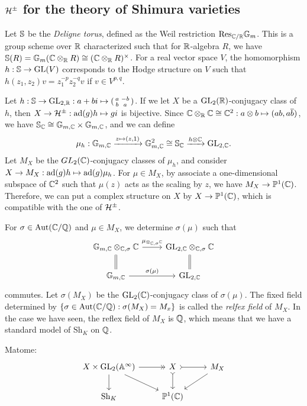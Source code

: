 \documentclass{../../../small}
\newcommand{\Sh}{\mathrm{Sh}}
\begin{document}
\subsection{$\cH^\pm$ for the theory of Shimura varieties}

Let $\S$ be the \emph{Deligne torus}, defined as the Weil restriction $\mathrm{Res}_{\C/\R}\G_m$.
This is a group scheme over $\R$ characterized such that for $\R$-algebra $R$, we have $\S(R)=\G_m(\C\otimes_\R R)\cong(\C\otimes_\R R)^\times$.
For a real vector space $V$, the homomorphism $h:\S\to\GL(V)$ corresponds to the Hodge structure on $V$ such that $h(z_1,z_2)v=z_1^{-p}z_2^{-q}v$ if $v\in V^{p,q}$.

Let $h:\S\to\GL_{2,\R}:a+bi\mapsto(\mat[small]{a&-b\\b&a})$.
If we let $X$ be a $\GL_2(\R)$-conjugacy class of $h$, then $X\to\cH^\pm:\ad(g)h\mapsto gi$ is bijective.
Since $\C\otimes_\R\C\cong\C^2:a\otimes b\mapsto(ab,a\bar b)$, we have $\S_\C\cong\G_{m,\C}\times\G_{m,\C}$, and we can define
\[\mu_h:\G_{m,\C}\xrightarrow{z\mapsto(z,1)}\G_{m,\C}^2\cong\S_\C\xrightarrow{h\otimes\C}\GL_{2,\C}.\]
Let $M_X$ be the $GL_2(\C)$-conjugacy classes of $\mu_h$, and consider $X\to M_X:\ad(g)h\mapsto\ad(g)\mu_h$.
For $\mu\in M_X$, by associate a one-dimensional subspace of $\C^2$ such that $\mu(z)$ acts as the scaling by $z$, we have $M_X\to\P^1(\C)$.
Therefore, we can put a complex structure on $X$ by $X\to\P^1(\C)$, which is compatible with the one of $\cH^\pm$.

For $\sigma\in\Aut(\C/\Q)$ and $\mu\in M_X$, we determine $\sigma(\mu)$ such that
\[\begin{tikzcd}
\G_{m,\C}\otimes_{\C,\sigma}\C \rar{\mu_{\otimes_{\C,\sigma}\C}}\dar[equal] & \GL_{2,\C}\otimes_{\C,\sigma}\C\dar[equal]\\
\G_{m,\C} \rar{\sigma(\mu)} & \GL_{2,\C}
\end{tikzcd}\]
commutes.
Let $\sigma(M_X)$ be the $\GL_2(\C)$-conjugacy class of $\sigma(\mu)$.
The fixed field determined by $\{\sigma\in\Aut(\C/\Q):\sigma(M_X)=M_x\}$ is called the \emph{relfex field} of $M_X$.
In the case we have seen, the reflex field of $M_X$ is $\Q$, which means that we have a standard model of $\Sh_K$ on $\Q$.


Matome:
\[\begin{tikzcd}
X\times\GL_2(\A^\infty) \rar[->>]\dar\ar{dr} & X \rar[>->]\dar[>->] & M_X \ar{dl} \\
\Sh_K &\P^1(\C)&
\end{tikzcd}\]
\end{document}
